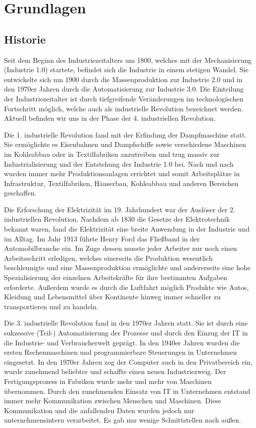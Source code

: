 \chapter{Grundlagen}
\section{Historie}
Seit dem Beginn des Industriezeitalters um 1800, welches mit der Mechanisierung (Industrie 1.0) startete, befindet sich die Industrie in einem stetigen Wandel. Sie entwickelte sich um 1900 durch die Massenproduktion zur Industrie 2.0 und in den 1970er Jahren durch die Automatisierung zur Industrie 3.0. Die Einteilung der Industriezeitalter ist durch tiefgreifende Veränderungen im technologischen Fortschritt möglich, welche auch als industrielle Revolution bezeichnet werden. Aktuell befinden wir uns in der Phase der 4. industriellen Revolution.

Die 1. industrielle Revolution fand mit der Erfindung der Dampfmaschine statt. Sie ermöglichte es Eisenbahnen und Dampfschiffe sowie verschiedene Maschinen im Kohleabbau oder in Textilfabriken anzutreiben und trug massiv zur Industrialisierung und der Entstehung der Industrie 1.0 bei. Nach und nach wurden immer mehr Produktionsanlagen errichtet und somit Arbeitsplätze in Infrastruktur, Textilfabriken, Häuserbau, Kohleabbau und anderen Bereichen geschaffen.

Die Erforschung der Elektrizität im 19. Jahrhundert war der Auslöser der 2. industriellen Revolution. Nachdem ab 1830 die Gesetze der Elektrotechnik bekannt waren, fand die Elektrizität eine breite Anwendung in der Industrie und im Alltag. Im Jahr 1913 führte Henry Ford das Fließband in der Automobilbranche ein. Im Zuge dessen musste jeder Arbeiter nur noch einen Arbeitsschritt erledigen, welches einerseits die Produktion wesentlich beschleunigte und eine Massenproduktion ermöglichte und andererseits eine hohe Spezialisierung der einzelnen Arbeitskräfte für ihre bestimmten Aufgaben erforderte. Außerdem wurde es durch die Luftfahrt möglich Produkte wie Autos, Kleidung und Lebensmittel über Kontinente hinweg immer schneller zu transportieren und zu handeln.

Die 3. industrielle Revolution fand in den 1970er Jahren statt. Sie ist durch eine sukzessive (Teil-) Automatisierung der Prozesse und durch den Einzug der IT in die Industrie- und Verbraucherwelt geprägt. In den 1940er Jahren wurden die ersten Rechenmaschinen und programmierbare Steuerungen in Unternehmen eingesetzt. In den 1970er Jahren zog der Computer auch in den Privatbereich ein, wurde zunehmend beliebter und schaffte einen neuen Industriezweig. Der Fertigungsprozess in Fabriken wurde mehr und mehr von Maschinen übernommen. Durch den zunehmenden Einsatz von IT in Unternehmen entstand immer mehr Kommunikation zwischen Menschen und Maschinen. Diese Kommunikation und die anfallenden Daten wurden jedoch nur unternehmensintern verarbeitet. Es gab nur wenige Schnittstellen nach außen.


